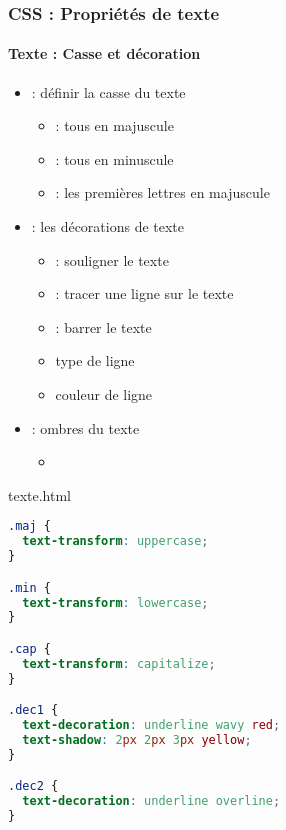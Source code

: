 \documentclass[xcolor=table]{beamer}
\begin{document}
\begin{frame}[fragile]
\frametitle{CSS : Propriétés de texte}
\framesubtitle{Texte : Casse et décoration}

\begin{minipage}{0.60\textwidth}
	\begin{itemize}
		\item {} : définir la casse du texte
		\begin{itemize}
			\item {} : tous en majuscule
			\item {} : tous en minuscule
			\item {} : les premières lettres en majuscule
		\end{itemize}
		\item {} :  les décorations de texte
		\begin{itemize}
			\item {} : souligner le texte
			\item {} : tracer une ligne sur le texte
			\item {} : barrer le texte
			\item type de ligne
			\item couleur de ligne
		\end{itemize}
		\item {} : ombres du texte
		\begin{itemize}
			\item {} 
		\end{itemize}
	\end{itemize}
\end{minipage}
%
\begin{minipage}{0.38\textwidth}
	\begin{exampleblock}{texte.html}
		\lstset{escapeinside=**}
		\tiny\bfseries
\begin{lstlisting}[language={CSS}]
.maj {
  text-transform: uppercase;
}

.min {
  text-transform: lowercase;
}

.cap {
  text-transform: capitalize;
}

.dec1 {
  text-decoration: underline wavy red;
  text-shadow: 2px 2px 3px yellow;
}

.dec2 {
  text-decoration: underline overline;
}
\end{lstlisting}
	\end{exampleblock}
\end{minipage}
\end{frame}
\end{document}
